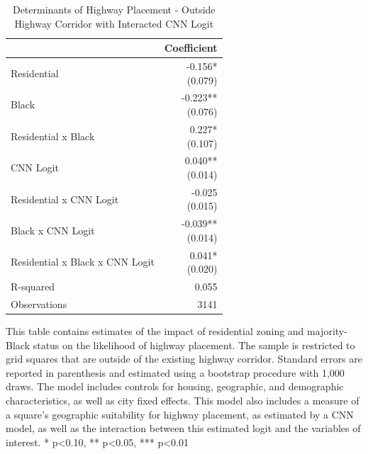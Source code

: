 \begin{table}[h]
\centering
\caption{Determinants of Highway Placement - Outside Highway Corridor with Interacted CNN Logit}
\label{tab:indirect_results}
\begin{threeparttable}
\begin{tabular*}{0.6\textwidth}{@{\extracolsep{\fill}}l*{1}{r}}
\toprule
 & Coefficient \\
\midrule
Residential & \makecell[tr]{-0.156{*} \\ (0.079)} \\
Black & \makecell[tr]{-0.223{**} \\ (0.076)} \\
Residential x Black & \makecell[tr]{0.227{*} \\ (0.107)} \\
CNN Logit & \makecell[tr]{0.040{**} \\ (0.014)} \\
Residential x CNN Logit & \makecell[tr]{-0.025 \\ (0.015)} \\
Black x CNN Logit & \makecell[tr]{-0.039{**} \\ (0.014)} \\
Residential x Black x CNN Logit & \makecell[tr]{0.041{*} \\ (0.020)} \\
R-squared & 0.055 \\
Observations & 3141 \\
\bottomrule
\end{tabular*}
\begin{tablenotes}[flushleft]
\footnotesize
\item This table contains estimates of the impact of residential zoning and majority-Black status on the likelihood of highway placement. The sample is restricted to grid squares that are outside of the existing highway corridor. Standard errors are reported in parenthesis and estimated using a bootstrap procedure with 1,000 draws. The model includes controls for housing, geographic, and demographic characteristics, as well as city fixed effects. This model also includes a measure of a square's geographic suitability for highway placement, as estimated by a CNN model, as well as the interaction between this estimated logit and the variables of interest. * p<0.10, ** p<0.05, *** p<0.01
\end{tablenotes}
\end{threeparttable}
\end{table}
